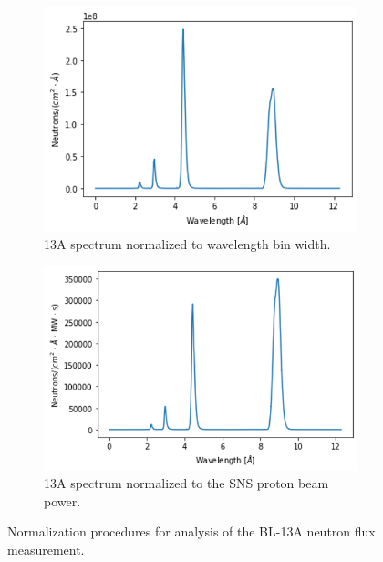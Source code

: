 {\begin{figure}
\begin{subfigure}[b]{0.475\textwidth}
            \centering 
            \includegraphics[width=\textwidth]{chop_bin.png}
            \caption{13A spectrum normalized to wavelength bin width.}    
            \label{fig:neutronbinwidth}
        \end{subfigure}
        \hfill
        \begin{subfigure}[b]{0.475\textwidth}   
            \centering 
            \includegraphics[width=\textwidth]{chop_power.png}
            \caption{13A spectrum normalized to the SNS proton beam power.}    
            \label{fig:neutronpower}
        \end{subfigure}

\caption{Normalization procedures for analysis of the BL-13A neutron flux measurement.} 
\label{fig:Fluxanalysis}
\end{figure}
\clearpage}

